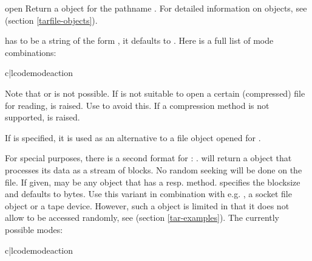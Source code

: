 \begin{funcdesc}{open}{}
    Return a  object for the pathname .
    For detailed information on  objects,
    see  (section \ref{tarfile-objects}).

     has to be a string of the form ,
    it defaults to . Here is a full list of mode combinations:

    \begin{tableii}{c|l}{code}{mode}{action}
    \end{tableii}

    Note that  or  is not possible.
    If  is not suitable to open a certain (compressed) file for
    reading,  is raised. Use   to
    avoid this.  If a compression method is not supported,
     is raised.

    If  is specified, it is used as an alternative to
    a file object opened for .

    For special purposes, there is a second format for :
    .   will return a 
    object that processes its data as a stream of blocks. No random
    seeking will be done on the file. If given,  may be any
    object that has a  resp.  method.
     specifies the blocksize and defaults to 
    bytes. Use this variant in combination with e.g. , a socket
    file object or a tape device.
    However, such a  object is limited in that it does not allow
    to be accessed randomly, see  (section
    \ref{tar-examples}).
    The currently possible modes:

    \begin{tableii}{c|l}{code}{mode}{action}
    \end{tableii}
\end{funcdesc}

